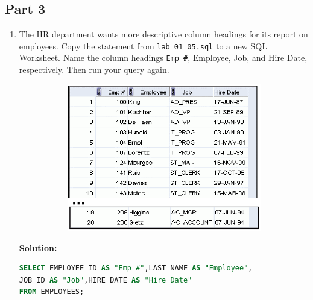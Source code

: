 \documentclass[a4paper,12pt]{article}
\begin{document}
\subsection*{Part 3}
\begin{enumerate}[start=8]
    \item The HR department wants more descriptive column headings for its report on employees. Copy
    the statement from \texttt{lab\_01\_05.sql} to a new SQL Worksheet. Name the column headings
    \texttt{Emp \#}, Employee, Job, and Hire Date, respectively. Then run your query again.
    \begin{figure}[h]
        \centering
        \begin{subfigure}[b]{0.5\linewidth}
            \centering
            \includegraphics[width=\linewidth]{graphics/8.png}
        \end{subfigure}
    \end{figure}

    \textbf{Solution: }
    \begin{lstlisting}[language=SQL]
SELECT EMPLOYEE_ID AS "Emp #",LAST_NAME AS "Employee", 
JOB_ID AS "Job",HIRE_DATE AS "Hire Date"
FROM EMPLOYEES;
    \end{lstlisting}
    

\end{enumerate}
\end{document}
